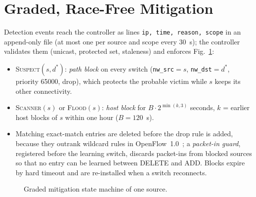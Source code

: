 \documentclass[conference]{IEEEtran}
\newcommand{\cmd}[1]{\texttt{#1}}
\begin{document}
\section{Graded, Race-Free Mitigation}\label{sec:mitig}
Detection events reach the controller as lines \cmd{ip, time, reason, scope} in an append-only file (at most one per
source and scope every 30~s); the controller validates them (unicast, protected set, staleness) and enforces
Fig.~\ref{fig:fsm}:
\begin{itemize}
\item \textsc{Suspect}$(s,d^*)$: \emph{path block} on every switch (\cmd{nw\_src}$=s$, \cmd{nw\_dst}$=d^*$, priority
65000, drop), which protects the probable victim while $s$ keeps its other connectivity.
\item \textsc{Scanner}$(s)$ or \textsc{Flood}$(s)$: \emph{host block} for $B\cdot2^{\min(k,3)}$ seconds, $k$ = earlier
host blocks of $s$ within one hour ($B=120$~s).
\item Matching exact-match entries are deleted before the drop rule is added, because they outrank wildcard rules in
OpenFlow~1.0~\cite{onf2009of10}; a \emph{packet-in guard}, registered before the learning switch, discards packet-ins from
blocked sources so that no entry can be learned between DELETE and ADD. Blocks expire by hard timeout and are re-installed
when a switch reconnects.
\end{itemize}

\begin{figure}[!tb]
\centering
{}
\caption{Graded mitigation state machine of one source.}\label{fig:fsm}
\end{figure}

\end{document}
